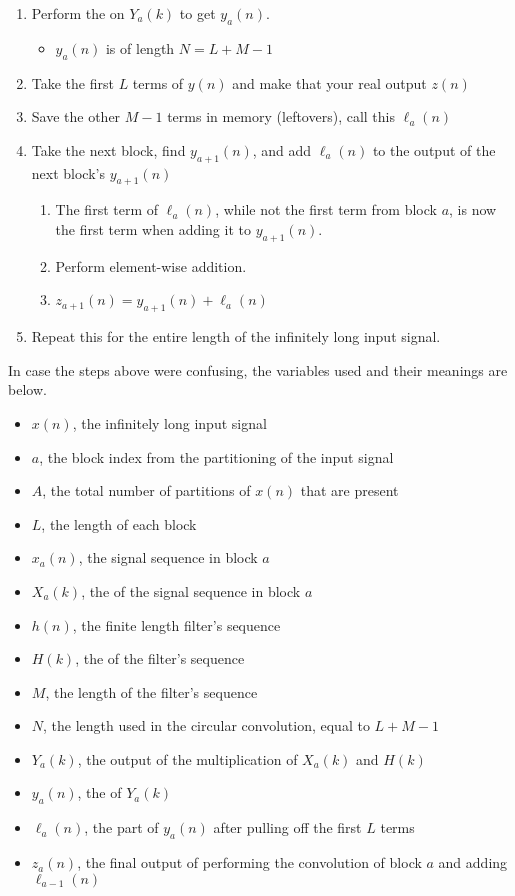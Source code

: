 \begin{enumerate}[noitemsep]
\item Perform the  on $Y_{a}(k)$ to get $y_{a}(n)$.
  \begin{itemize}[noitemsep]
  \item $y_{a}(n)$ is of length $N=L+M-1$
  \end{itemize}
\item Take the first $L$ terms of $y(n)$ and make that your real output $z(n)$
\item Save the other $M-1$ terms in memory (leftovers), call this $\ell_{a}(n)$
\item Take the next block, find $y_{a+1}(n)$, and add $\ell_{a}(n)$ to the output of the next block's $y_{a+1}(n)$
  \begin{enumerate}[noitemsep]
  \item The first term of $\ell_{a}(n)$, while not the first term from block $a$, is now the first term when adding it to $y_{a+1}(n)$.
  \item Perform element-wise addition.
  \item $z_{a+1}(n) = y_{a+1}(n) + \ell_{a}(n)$
  \end{enumerate}
\item Repeat this for the entire length of the infinitely long input signal.
\end{enumerate}

\begin{remark*}
  In case the steps above were confusing, the variables used and their meanings are below.
  \begin{itemize}[noitemsep]
  \item $x(n)$, the infinitely long input signal
  \item $a$, the block index from the partitioning of the input signal
  \item $A$, the total number of partitions of $x(n)$ that are present
  \item $L$, the length of each block
  \item $x_{a}(n)$, the signal sequence in block $a$
  \item $X_{a}(k)$, the  of the signal sequence in block $a$
  \item $h(n)$, the finite length filter's sequence
  \item $H(k)$, the  of the filter's sequence
  \item $M$, the length of the filter's sequence
  \item $N$, the length used in the circular convolution, equal to $L+M-1$
  \item $Y_{a}(k)$, the output of the multiplication of $X_{a}(k)$ and $H(k)$
  \item $y_{a}(n)$, the  of $Y_{a}(k)$
  \item $\ell_{a}(n)$, the part of $y_{a}(n)$ after pulling off the first $L$ terms
  \item $z_{a}(n)$, the final output of performing the convolution of block $a$ and adding $\ell_{a-1}(n)$
  \end{itemize}
\end{remark*}


